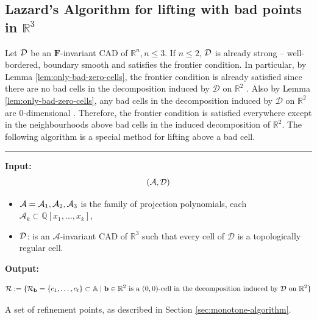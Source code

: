 \documentclass[
]{book}
\theoremstyle{definition}
\theoremstyle{definition}
\theoremstyle{definition}
\theoremstyle{definition}
\theoremstyle{remark}
\begin{document}
\hypertarget{lazards-algorithm-for-lifting-with-bad-points-in-mathbbr3}{%
\subsection{\texorpdfstring{Lazard's Algorithm for lifting with bad points in \(\mathbb{R}^3\)}{Lazard's Algorithm for lifting with bad points in \textbackslash mathbb\{R\}\^{}3}}\label{lazards-algorithm-for-lifting-with-bad-points-in-mathbbr3}}

Let \(\cal D\) be an \(\mathbf{F}\)-invariant CAD of \(\mathbb{R}^n, n \le 3\). If \(n \le 2\), \(\cal D\) is already strong -- well-bordered, boundary smooth and satisfies the frontier condition. In particular, by Lemma \ref{lem:only-bad-zero-cells}, the frontier condition is already satisfied since there are no bad cells in the decomposition induced by \(\mathcal{D}\) on \(\mathbb{R}^2\) \citep[Lemma 4.3]{lazard10}.
Also by Lemma \ref{lem:only-bad-zero-cells}, any bad cells in the decomposition induced by \(\mathcal{D}\) on \(\mathbb{R}^2\) are \(0\)-dimensional \citep[Lemma 4.3]{lazard10}.
Therefore, the frontier condition is satisfied everywhere except in the neighbourhoods above bad cells in the induced decomposition of \(\mathbb{R}^2\). The following algorithm is a special method for lifting above a bad cell.

\begin{center}\rule{0.5\linewidth}{0.5pt}\end{center}

\citep[Algorithm 5.15]{lazard10}

\textbf{Input:}
\[({\cal A}, {\cal D})\]

\begin{itemize}
\item
  \({\cal A} = {\cal A}_1,{\cal A}_2,{\cal A}_3\) is the family of projection polynomials, each \(\mathcal{A}_k \subset \mathbb{Q}[x_1,\ldots,x_k]\),
\item
  \(\cal D\): is an \(\mathcal{A}\)-invariant CAD of \(\mathbb{R}^3\) such that every cell of \(\mathcal{D}\) is a topologically regular cell.
\end{itemize}

\textbf{Output:}

\[
{\cal R} := \{ {\cal R}_{\mathbf{b}} = \{ c_1,\ldots,c_t \} \subset \mathbb{A}\mid \mathbf{b} \in \mathbb{R}^{2} \text{ is a } (0,0) \text{-cell in the decomposition induced by } {\cal D} \text{ on } \mathbb{R}^2 \}
\]

A set of refinement points, as described in Section \ref{sec:monotone-algorithm}.
\end{document}

